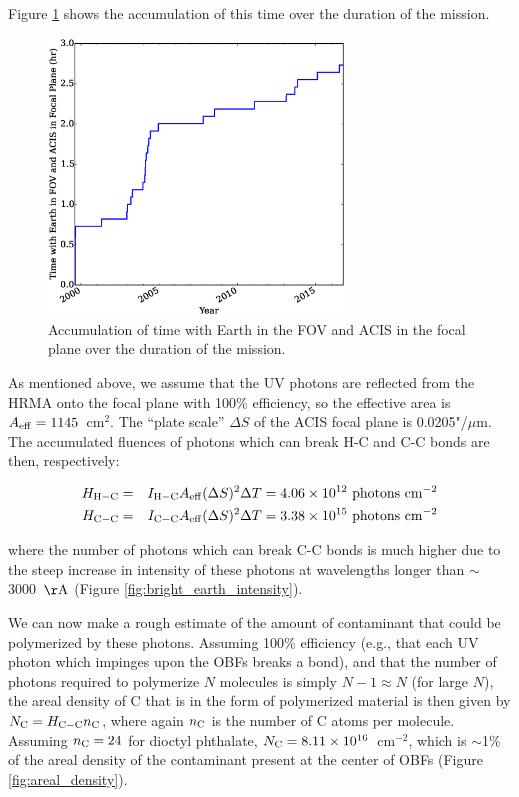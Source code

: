 \documentclass[11pt]{article}
\begin{document}
\noindent
Figure \ref{fig:time_accum} shows the accumulation of this time over the duration of the mission.

\begin{figure}
\begin{center}
\includegraphics[width=0.7\textwidth]{time_accum.eps}
\caption{Accumulation of time with Earth in the FOV and ACIS in the focal plane over the duration of the mission.\label{fig:time_accum}}
\end{center}
\end{figure}

As mentioned above, we assume that the UV photons are reflected from the HRMA onto the focal plane with 100\% efficiency,
so the effective area is $A_{\rm eff} = 1145$~cm$^2$. The ``plate scale'' $\Delta{S}$ of the ACIS focal plane is 0.0205"/$\mu$m.
The accumulated fluences of photons which can break H-C and C-C bonds are then, respectively:

\begin{eqnarray}
H_{\rm H-C} &=& I_{\rm H-C}A_{\rm eff}(\Delta{S})^2\Delta{T} = 4.06 \times 10^{12}~{\rm photons~cm^{-2}} \\
H_{\rm C-C} &=& I_{\rm C-C}A_{\rm eff}(\Delta{S})^2\Delta{T} = 3.38 \times 10^{15}~{\rm photons~cm^{-2}}\label{eqn:fluence}
\end{eqnarray}

\noindent
where the number of photons which can break C-C bonds is much higher due to the steep increase in intensity of these photons
at wavelengths longer than $\sim$3000~${\rm \AA}$ (Figure \ref{fig:bright_earth_intensity}).

We can now make a rough estimate of the amount of contaminant that could be polymerized by these photons. Assuming 100\%
efficiency (e.g., that each UV photon which impinges upon the OBFs breaks a bond), and that the number of photons required
to polymerize $N$ molecules is simply $N-1 \approx N$ (for large $N$), the areal density of C that is in the form of
polymerized material is then given by $N_{\rm C} = H_{\rm C-C}n_{\rm C}$, where again $n_{\rm C}$ is the number of C atoms per
molecule. Assuming $n_{\rm C} = 24$ for dioctyl phthalate, $N_{\rm C} = 8.11 \times 10^{16}$~cm$^{-2}$, which is $\sim$1\%
of the areal density of the contaminant present at the center of OBFs (Figure \ref{fig:areal_density}).
\end{document}
